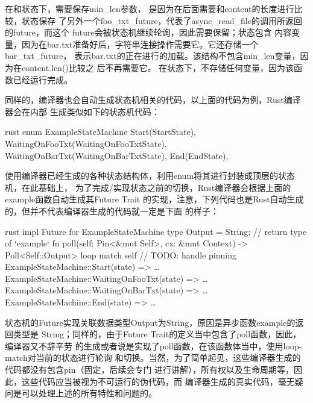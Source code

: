 在和状态下，需要保存min\_len参数，
是因为在后面需要和content的长度进行比较，状态保存
了另外一个foo\_txt\_future，代表了async\_read\_file的调用所返回的future，而这个
future会被状态机继续轮询，因此需要保留；状态包含
内容变量，因为在bar.txt准备好后，字符串连接操作需要它。它还存储一个bar\_txt\_future，
表示bar.txt的正在进行的加载。该结构不包含min\_len变量，因为在content.len()比较之
后不再需要它。 在状态下，不存储任何变量，因为该函数已经运行完成。

同样的，编译器也会自动生成状态机相关的代码，以上面的代码为例，Rust编译器会在内部
生成类似如下的状态机代码：
\begin{code-block}{rust}
enum ExampleStateMachine {
    Start(StartState),
    WaitingOnFooTxt(WaitingOnFooTxtState),
    WaitingOnBarTxt(WaitingOnBarTxtState),
    End(EndState),
}
\end{code-block}

使用编译器已经生成的各种状态结构体，利用enum将其进行封装成顶层的状态机，在此基础上，
为了完成/实现状态之前的切换，Rust编译器会根据上面的example函数自动生成其Future Trait
的实现，注意，下列代码也是Rust自动生成的，但并不代表编译器生成的代码就一定是下面
的样子：
\begin{code-block}{rust}
impl Future for ExampleStateMachine {
    type Output = String; // return type of `example`
    fn poll(self: Pin<&mut Self>, cx: &mut Context) -> Poll<Self::Output> {
        loop {
            match self { // TODO: handle pinning
                ExampleStateMachine::Start(state) => {…}
                ExampleStateMachine::WaitingOnFooTxt(state) => {…}
                ExampleStateMachine::WaitingOnBarTxt(state) => {…}
                ExampleStateMachine::End(state) => {…}
            }
        }
    }
}
\end{code-block}

状态机的Future实现关联数据类型Output为String，原因是异步函数example的返回类型是
String；同样的，由于Future Trait的定义当中包含了poll函数，因此，编译器又不辞辛劳
的生成或者说是实现了poll函数，在该函数体当中，使用loop-match对当前的状态进行轮询
和切换。当然，为了简单起见，这些编译器生成的代码都没有包含pin（固定，后续会专门
进行讲解），所有权以及生命周期等，因此，这些代码应当被视为不可运行的伪代码，而
编译器生成的真实代码，毫无疑问是可以处理上述的所有特性和问题的。

